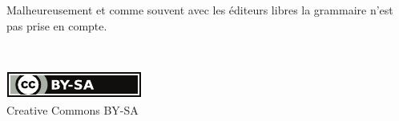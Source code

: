 \documentclass[pdftex,a4paper,11pt]{article}
\begin{document}
Malheureusement et comme souvent avec les éditeurs libres la grammaire n'est pas prise en compte.

~\\

\begin{center}
    \href{http://creativecommons.org/licenses/by-sa/2.0/fr/}{\includegraphics[width=.15\linewidth]{images/cc_by_sa_small}}\\
	\small{Creative Commons BY-SA}
\end{center}
\end{document}
